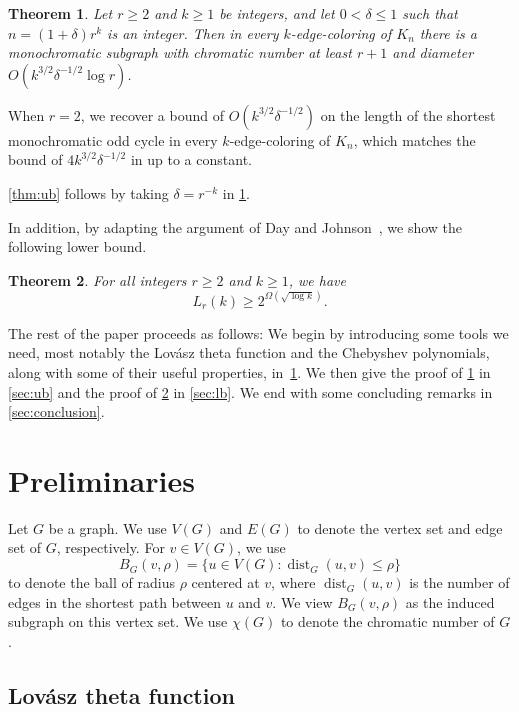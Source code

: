 \documentclass[reqno]{amsart}
\newtheorem{theorem}{Theorem}
\theoremstyle{remark}
\theoremstyle{definition}
\numberwithin{theorem}{section}
\renewcommand{\le}{\leqslant}
\renewcommand{\ge}{\geqslant}
\newcommand{\dist}{\operatorname{dist}}
\begin{document}
\begin{theorem}\label{thm:ub-gen}
 Let $r\ge 2$ and $k\ge 1$ be integers, and let $0<\delta \le 1$ such that $n=(1+\delta)r^k$ is an integer. Then in every $k$-edge-coloring of $K_n$ there is a monochromatic subgraph with chromatic number at least $r+1$ and diameter $O(k^{3/2}\delta^{-1/2}\log r)$.
\end{theorem}
When $r=2$, we recover a bound of $O(k^{3/2}\delta^{-1/2})$ on the length of the shortest monochromatic odd cycle in every $k$-edge-coloring of $K_n$, which matches the bound of $4k^{3/2}\delta^{-1/2}$ in \cite[Theorem~1.5]{JanzerYip2026ShortMonochromaticOddCycles} up to a constant.

\cref{thm:ub} follows by taking $\delta=r^{-k}$ in \cref{thm:ub-gen}.

In addition, by adapting the argument of Day and Johnson~\cite{DayJohnson2017MulticolourRamseyOddCycles}, we show the following lower bound.

\begin{theorem}\label{thm:lb}
    For all integers $r\ge 2$ and $k\ge 1$, we have
    \[L_r(k)\ge 2^{\Omega(\sqrt{\log k})}.\]
\end{theorem}

The rest of the paper proceeds as follows: We begin by introducing some tools we need, most notably the Lov\'asz theta function and the Chebyshev polynomials, along with some of their useful properties, in~\cref{sec:prelims}. We then give the proof of \cref{thm:ub-gen} in \cref{sec:ub} and the proof of \cref{thm:lb} in \cref{sec:lb}. We end with some concluding remarks in \cref{sec:conclusion}.

\section{Preliminaries}
\label{sec:prelims}

Let $G$ be a graph. We use $V(G)$ and $E(G)$ to denote the vertex set and edge set of $G$, respectively. For $v\in V(G)$, we use
\[B_G(v,\rho)=\{u\in V(G):\dist_G(u,v)\le \rho\}\]
to denote the ball of radius $\rho$ centered at $v$, where $\dist_G(u,v)$ is the number of edges in the shortest path between $u$ and $v$. We view $B_G(v,\rho)$ as the induced subgraph on this vertex set. We use $\chi(G)$ to denote the chromatic number of $G$.


\subsection{Lov\'asz theta function} 
\end{document}
